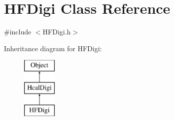 \hypertarget{class_h_f_digi}{}\section{H\+F\+Digi Class Reference}
\label{class_h_f_digi}


{\ttfamily \#include $<$H\+F\+Digi.\+h$>$}

Inheritance diagram for H\+F\+Digi\+:\begin{figure}[H]
\begin{center}
\leavevmode
\includegraphics[height=3.000000cm]{class_h_f_digi}
\end{center}
\end{figure}
